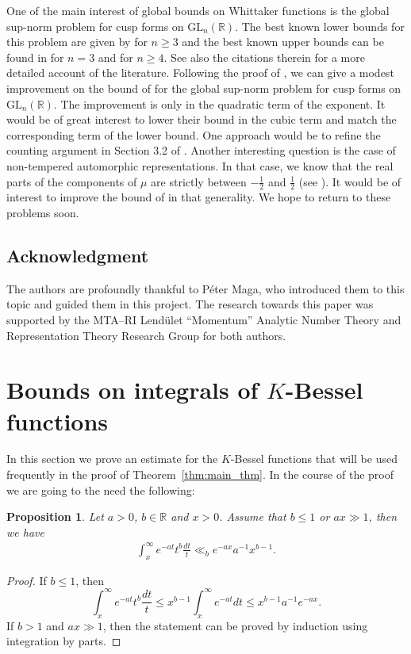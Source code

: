 \documentclass[11pt, oneside]{amsart}
\theoremstyle{plain}
\newtheorem{prop}[theorem]{Proposition}
\theoremstyle{remark}
\newcommand{\R}{\mathbb{R}}
\begin{document}
One of the main interest of global bounds on Whittaker functions is the global sup-norm problem for cusp forms on $\mathrm{GL}_n(\R)$. The best known lower bounds for this problem are given by \cite{BrTe} for $n\geq3$ and the best known upper bounds can be found in \cite{BHM19} for $n=3$ and \cite{BHM20} for $n\geq4$. See also the citations therein for a more detailed account of the literature. Following the proof of \cite{BHM20}, we can give a modest improvement on the bound of \cite[Theorem 4]{BHM20} for the global sup-norm problem for cusp forms on $\mathrm{GL}_n(\R)$. The improvement is only in the quadratic term of the exponent. It would be of great interest to lower their bound in the cubic term and match the corresponding term of the lower bound. One approach would be to refine the counting argument in Section 3.2 of \cite{BHM20}. Another interesting question is the case of non-tempered automorphic representations. In that case, we know that the real parts of the components of $\mu$ are strictly between $-\frac12$ and $\frac12$ (see \cite[Equation (5)]{BHM20}). It would be of interest to improve the bound of \cite[Theorem 2]{BHM20} in that generality. We hope to return to these problems soon.

\subsection{Acknowledgment}
The authors are profoundly thankful to Péter Maga, who introduced them to this topic and guided them in this project. The research towards this paper was supported by the MTA–RI Lendület “Momentum” Analytic Number Theory and Representation Theory Research Group for both authors.


\section{Bounds on integrals of \texorpdfstring{$K$}{K}-Bessel functions}

In this section we prove an estimate for the $K$-Bessel functions that will be used frequently 
in the proof of Theorem~\ref{thm:main_thm}.  In the course of the proof we are going to the need the following:
\begin{prop}
Let $a>0$, $b\in\R$ and $x>0$. Assume that $b\leq1$ or $ax\gg1$, then we have
\begin{align}\label{eq bound partial Gamma}
\int_x^\infty e^{-at}t^b\frac{dt}t\ll_be^{-ax}a^{-1}x^{b-1}.
\end{align}    
\end{prop}
\begin{proof}
If $b\leq1$, then
\[
\int_x^\infty e^{-at}t^b\frac{dt}t\leq x^{b-1}\int_x^\infty e^{-at}dt\leq x^{b-1}a^{-1}e^{-  
ax}.
\]
If $b>1$ and $ax\gg 1$, then the statement can be proved by induction using 
integration by parts.
\end{proof}
\end{document}
